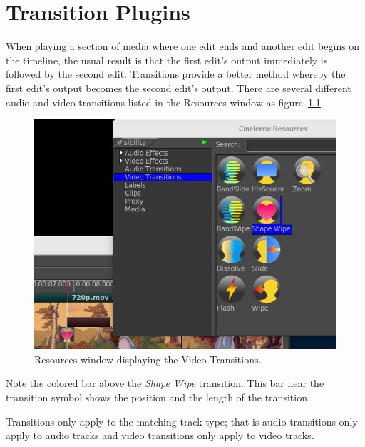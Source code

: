 \chapter{Transition Plugins}%
\label{cha:transition_plugin}

When playing a section of media where one edit ends and another edit begins on the timeline,
the usual result is that the first edit's output immediately is followed by the second edit.  Transitions provide a better method whereby the first edit’s output becomes the second edit’s output.  There are several different audio and video transitions listed in the Resources window as figure~\ref{fig:transition}.

\begin{figure}[htpb]
    \centering
    \includegraphics[width=0.8\linewidth]{images/transition.png}
    \caption{Resources window displaying the Video Transitions.}
    \label{fig:transition}
\end{figure}

Note the colored bar above the \textit{Shape Wipe} transition.
This bar near the transition symbol shows the position and the length of the transition.

Transitions only apply to the matching track type; that is audio transitions only apply to audio tracks
and video transitions only apply to video tracks.

